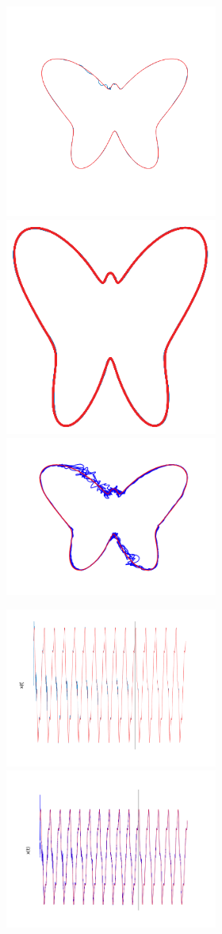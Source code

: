 \begin{figure}
    \begin{subfigure}{\textwidth}
        \centering
        
        \textbf{}\begin{subfigure}{\textwidth}
        \centering
    
        \includegraphics[trim=1.5cm 3cm 1.5cm 3cm, clip=true, height=.2\linewidth]{Figures/MATLAB/ST_T1_TimeSeries.png} 
        \hspace{3em}
        \includegraphics[height=.19\linewidth]{Figures/Orig/ST_T1_TimeSeries.png}
        \hspace{3em} \includegraphics[trim=1.5cm 1.2cm 1.5cm 1.2cm, clip=true,  height=.2\linewidth]{Figures/Python/ST_T1_TimeSeries.png}
        
        \end{subfigure}
         
        
        
        \textbf{}\begin{subfigure}{\textwidth}
        \centering
        
        \includegraphics[trim=2cm 0cm 0cm 0cm, clip=true,height=0.1\linewidth,width=.45\linewidth]{Figures/MATLAB/ST_T1_CoordinateX.png}
        \includegraphics[trim=2cm 0cm 0cm 0cm, clip=true,height=0.1\linewidth,width=.45\linewidth]{Figures/Python/ST_T1_CoordinateX.png}
        

\end{subfigure}
\end{subfigure}
\end{figure}
